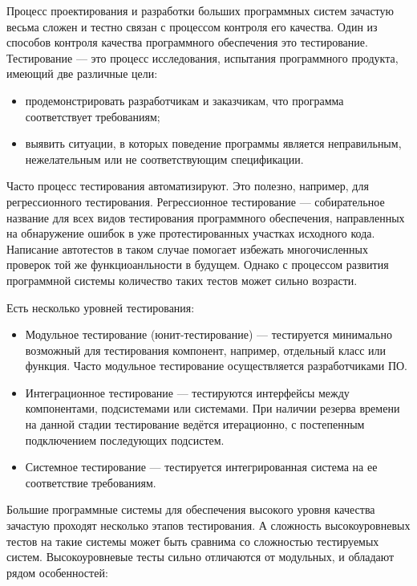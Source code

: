 \startprefacepage

Процесс проектирования и разработки больших программных систем зачастую весьма сложен и тестно связан с процессом контроля его качества. Один из способов контроля качества программного обеспечения это тестирование. Тестирование --- это процесс исследования, испытания программного продукта, имеющий две различные цели:

\begin{itemize}
\item продемонстрировать разработчикам и заказчикам, что программа соответствует требованиям;
\item выявить ситуации, в которых поведение программы является неправильным, нежелательным или не соответствующим спецификации.  
\end{itemize}

Часто процесс тестирования автоматизируют. Это полезно, например, для регрессионного тестирования. Регрессионное тестирование --- собирательное название для всех видов тестирования программного обеспечения, направленных на обнаружение ошибок в уже протестированных участках исходного кода. Написание автотестов в таком случае помогает избежать многочисленных проверок той же функциоанльности в будущем. Однако с процессом развития программной системы количество таких тестов может сильно возрасти. 

Есть несколько уровней тестирования:

\begin{itemize}
\item Модульное тестирование (юнит-тестирование) --- тестируется минимально возможный для тестирования компонент, например, отдельный класс или функция. Часто модульное тестирование осуществляется разработчиками ПО.
\item Интеграционное тестирование --- тестируются интерфейсы между компонентами, подсистемами или системами. При наличии резерва времени на данной стадии тестирование ведётся итерационно, с постепенным подключением последующих подсистем.
\item Системное тестирование --- тестируется интегрированная система на ее соответствие требованиям.
\end{itemize}

Большие программные системы для обеспечения высокого уровня качества зачастую проходят несколько этапов тестирования. А сложность высокоуровневых тестов на такие системы может быть сравнима со сложностью тестируемых систем. Высокоуровневые тесты сильно отличаются от модульных, и обладают рядом особенностей:


